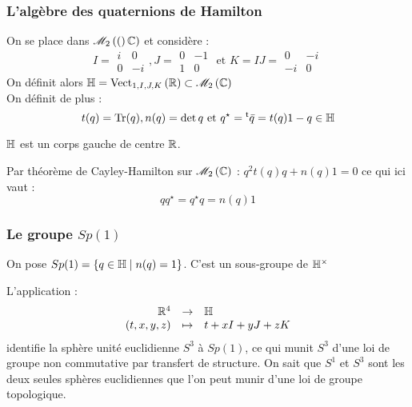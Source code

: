 \documentclass{cours}
\begin{document}
\subsubsection{L'algèbre des quaternions de Hamilton}
\begin{definition}
    On se place dans $\mat{2}(\C)$ et considère :
    \[
        I = \begin{matrix}
            i & 0 \\ 0 & -i
        \end{matrix},
        J = \begin{matrix}
            0 & -1 \\ 1 & 0
        \end{matrix}
        \text{ et } K = IJ = \begin{matrix}
            0 & -i \\ -i & 0
        \end{matrix}
    \]
    On définit alors $\mathbb{H} = \vect[\R]{1, I, J, K} \subset \mat{2}{\C}$\\

    On définit de plus :
    \[
        t(q) = \Tr(q), n(q) = \det q \text{ et } q^{\star} = \transpose{\bar{q}} = t(q)1 - q \in \H
    \]
\end{definition}

\begin{proposition}
    $\H$ est un corps gauche de centre $\R$.
\end{proposition}

\begin{proposition}
    Par théorème de Cayley-Hamilton sur $\mat{2}{\C}$ : $q^{2}t(q)q + n(q)1 = 0$ ce qui ici vaut :
    \[qq^{\star} = q^{\star}q = n(q)1\]
\end{proposition}


\subsubsection{Le groupe $Sp(1)$}
\begin{definition}
    On pose $Sp(1) = \left\{q \in \H \mid n(q) = 1\right\}$. C'est un sous-groupe de $\H^{\times}$
\end{definition}

\begin{remark}
    L'application :
    \[
        \applic{\R^{4}}{\H}{\left(t, x, y, z\right)}{t + xI + yJ + zK}
    \]
    identifie la sphère unité euclidienne $S^{3}$ à $Sp(1)$, ce qui munit $S^{3}$ d'une loi de groupe non commutative par transfert de structure. On sait que $S^{1}$ et $S^{3}$ sont les deux seules sphères euclidiennes que l'on peut munir d'une loi de groupe topologique.
\end{remark}
\end{document}
